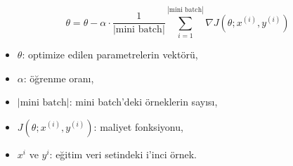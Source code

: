 \[\theta = \theta - \alpha \cdot \frac{1}{|\text{mini batch}|} \sum_{i=1}^{|\text{mini batch}|} \nabla J(\theta;x^{(i)},y^{(i)})\]
\begin{itemize}
	\item $\theta$: optimize edilen parametrelerin vektörü,
	\item $\alpha$: öğrenme oranı,
	\item ${|\text{mini batch}|}$: mini batch'deki örneklerin sayısı,
	\item $J(\theta;x^{(i)},y^{(i)})$: maliyet fonksiyonu,
	\item $x^{i}$ ve $y^{i}$: eğitim veri setindeki i'inci örnek.
\end{itemize}

\newpage